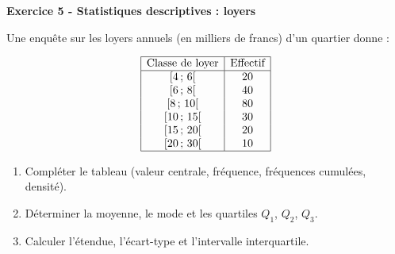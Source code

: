 \documentclass[12pt,a4paper]{article}
\begin{document}
\begin{boiteexercice}
\textbf{Exercice 5 - Statistiques descriptives : loyers}\niveau{\moyen}

Une enquête sur les loyers annuels (en milliers de francs) d'un quartier donne :

\[
\begin{array}{|c|c|}
\hline
\text{Classe de loyer} & \text{Effectif} \\
\hline
{[4\,;\,6[} & 20 \\
{[6\,;\,8[} & 40 \\
{[8\,;\,10[} & 80 \\
{[10\,;\,15[} & 30 \\
{[15\,;\,20[} & 20 \\
{[20\,;\,30[} & 10 \\
\hline
\end{array}
\]

\begin{enumerate}
  \item Compléter le tableau (valeur centrale, fréquence, fréquences cumulées, densité).
  \item Déterminer la moyenne, le mode et les quartiles $Q_1$, $Q_2$, $Q_3$.
  \item Calculer l'étendue, l'écart-type et l'intervalle interquartile.
\end{enumerate}
\end{boiteexercice}
\end{document}
